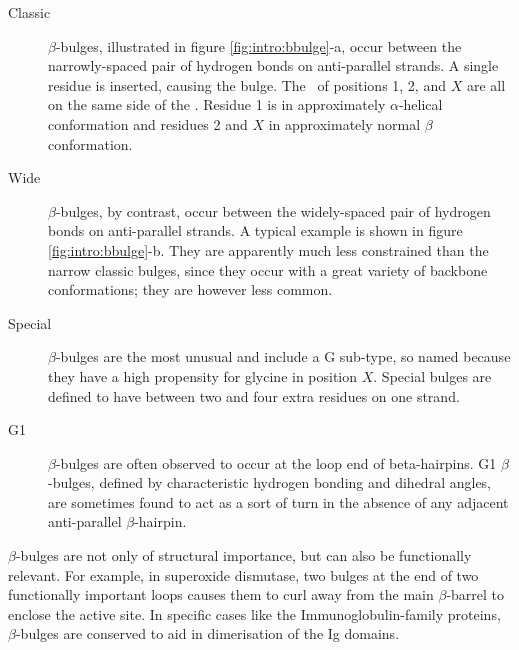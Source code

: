 \begin{description} \isep

\item[Classic] $\beta$-bulges, illustrated in figure \ref{fig:intro:bbulge}-a, occur between the narrowly-spaced pair of hydrogen
bonds on anti-parallel strands. A single residue is inserted, causing the bulge. The \sidechains\ of positions 1, 2, and $X$ are all on the same side of the \bsheet. Residue 1 is in approximately $\alpha$-helical conformation and residues 2 and $X$ in approximately normal $\beta$ conformation.

\item[Wide] $\beta$-bulges, by contrast, occur between the widely-spaced pair of hydrogen bonds on anti-parallel strands. A typical example is shown
in figure \ref{fig:intro:bbulge}-b. They are apparently much less constrained than the narrow classic bulges, since they occur with a great variety of backbone conformations; they are however less common. 

\item[Special] $\beta$-bulges are the most unusual and include a G sub-type, so named because they have a high propensity for glycine in position $X$.
Special bulges are defined to have between two and
four extra residues on one strand.
\item[G1] $\beta$-bulges are often observed to occur at the loop end of beta-hairpins. G1 $\beta$-bulges, defined by characteristic hydrogen bonding and dihedral angles, are sometimes found to act as a sort of turn in the absence of any adjacent anti-parallel $\beta$-hairpin.

\end{description}

$\beta$-bulges are not only of structural importance, but can also be functionally
relevant. For example, in superoxide dismutase, two bulges at the end of two functionally important loops causes them to curl away from the main $\beta$-barrel to enclose the active site\cite{STRUCTURE:Getzoff1989}. In specific cases like the Immunoglobulin-family proteins, $\beta$-bulges are conserved to aid in dimerisation of the Ig domains.
























